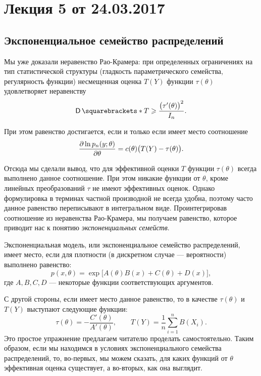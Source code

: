 \section{Лекция 5 от 24.03.2017}
\subsection{Экспоненциальное семейство распределений}
Мы уже доказали неравенство Рао-Крамера: при определенных ограничениях на тип статистической структуры (гладкость параметрического семейства, регулярность функции) несмещенная оценка $T(Y)$ функции $\tau(\theta)$ удовлетворяет неравенству
\[
    \D{T} \geqslant \frac{\big(\tau'(\theta)\big)^2}{I_n}.
\]

При этом равенство достигается, если и только если имеет место соотношение
\begin{gather}
    \frac{\partial\ln p_n(y; \theta)}{\partial \theta} = c(\theta)\big( T(Y) - \tau(\theta)\big).
\end{gather}

Отсюда мы сделали вывод, что для эффективной оценки $T$ функции $\tau(\theta)$ всегда выполнено данное соотношение. При этом никакие функции от $\theta$, кроме линейных преобразований $\tau$ не имеют эффективных оценок. Однако формулировка в терминах частной производной не всегда удобна, поэтому часто данное равенство переписывают в интегральном виде. Проинтегрировав соотношение из неравенства Рао-Крамера, мы получаем равенство, которое приводит нас к понятию \emph{экспоненциальных семейств}.

\begin{definition}
    Экспоненциальная модель, или экспоненциальное семейство распределений, имеет место, если для плотности (в дискретном случае --- вероятности) выполнено равенство:
    \[
        p(x, \theta) = \exp\Big[A(\theta)B(x) + C(\theta) + D(x)\Big],
    \]
    где $A, B, C, D$ --- некоторые функции соответствующих аргументов.
\end{definition}

С другой стороны, если имеет место данное равенство, то в качестве $\tau(\theta)$ и $T(Y)$ выступают следующие функции:
\[
    \tau(\theta) = -\frac{C'(\theta)}{A'(\theta)}, \qquad T(Y) = \frac1n \sum\limits_{i=1}^n B(X_i).
\]
Это простое упражнение предлагаем читателю проделать самостоятельно. Таким образом, если мы находимся в условиях экспоненциального семейства распределений, то, во-первых, мы можем сказать, для каких функций от $\theta$ эффективная оценка существует, а во-вторых, как она выглядит.

